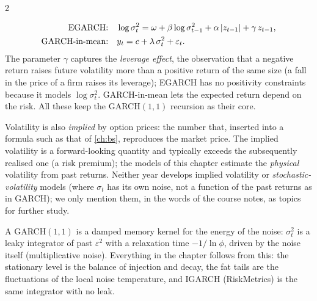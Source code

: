 \begin{paracol}{2}
\begin{secondary}
\begin{align}
  \text{EGARCH:}&\quad \log\sigma_t^2=\omega+\beta\log\sigma_{t-1}^2+\alpha\,|z_{t-1}|+\gamma\,z_{t-1},\notag\\
  \text{GARCH-in-mean:}&\quad y_t=c+\lambda\,\sigma_t^2+\varepsilon_t .\notag
\end{align}
The parameter $\gamma$ captures the \emph{leverage effect}, the observation that a negative return raises future volatility more than a positive return of the same size (a fall in the price of a firm raises its leverage); EGARCH has no positivity constraints because it models $\log\sigma_t^2$. GARCH-in-mean lets the
expected return depend on the risk. All these keep the GARCH$(1,1)$ recursion as their core.
\end{secondary}

\begin{finance}
Volatility is also \emph{implied} by option prices: the number that, inserted into a formula such as that of \cref{ch:bs}, reproduces the market price. The implied volatility is a forward-looking quantity and typically exceeds the subsequently realised one (a risk premium); the models of this chapter
estimate the \emph{physical} volatility from past returns. Neither year develops implied volatility or \emph{stochastic-volatility} models (where $\sigma_t$ has its own noise, not a function of the past returns as in GARCH); we only mention them, in the words of the course notes, as topics for further study.
\end{finance}
\begin{intuition}
A GARCH$(1,1)$ is a damped memory kernel for the energy of the noise: $\sigma_t^2$ is a leaky integrator of past $\varepsilon^2$ with a relaxation time $-1/\ln\phi$, driven by the noise itself (multiplicative noise).
Everything in the chapter follows from this: the stationary level is the balance of injection and decay, the fat tails are the fluctuations of the local noise temperature, and IGARCH (RiskMetrics) is the same integrator with no leak.
\end{intuition}


\end{paracol}
